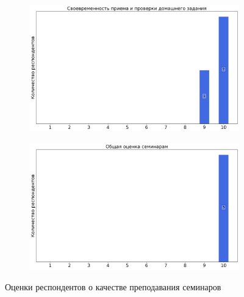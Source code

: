 \begin{figure}[H]
\begin{subfigure}[b]{0.45\textwidth}
                \includegraphics[width=\textwidth]{images/4 course/Квантовая механика/seminarists-marks-Дорофеенко А.В.-2.png}
            \end{subfigure}
            \begin{subfigure}[b]{0.45\textwidth}
                \centering
                \includegraphics[width=\textwidth]{images/4 course/Квантовая механика/seminarists-marks-Дорофеенко А.В.-3.png}
            \end{subfigure}	
            \caption{Оценки респондентов о качестве преподавания семинаров}
        \end{figure}

        
